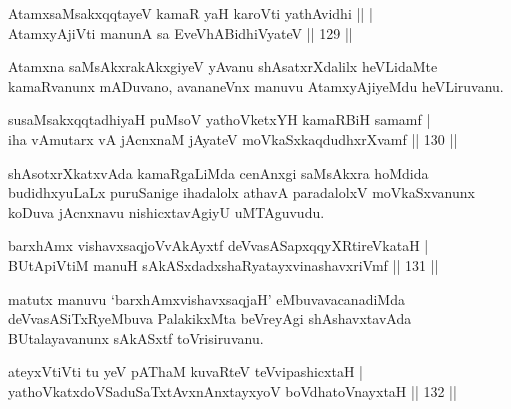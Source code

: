 \begin{shl}
AtamxsaMsakxqqtayeV kamaR yaH karoVti yathAvidhi \hfill || |\\
AtamxyAjiVti manunA sa EveVhABidhiVyateV \hfill || 129 ||
\end{shl}

\begin{artha}
Atamxna saMsAkxrakAkxgiyeV yAvanu shAsatxrXdalilx heVLidaMte kamaRvanunx mADuvano, avananeVnx manuvu AtamxyAjiyeMdu heVLiruvanu.
\end{artha}


\begin{shl}
susaMsakxqqtadhiyaH puMsoV yathoVketxYH kamaRBiH samamf |\\
iha vA\s mutarx vA jAcnxnaM jAyateV moVkaSxkaqdudhxrXvamf \hfill || 130 ||
\end{shl}

\begin{artha}
shAsotxrXkatxvAda kamaRgaLiMda cenAnxgi saMsAkxra hoMdida budidhxyuLaLx puruSanige ihadalolx athavA paradalolxV moVkaSxvanunx koDuva jAcnxnavu nishicxtavAgiyU uMTAguvudu.
\end{artha}

\begin{shl}
\footnotemark{}barxhAmx vishavxsaqjoVvAkAyxtf \footnotemark{}deVvasASapxqqyXRtireVkataH |\\
\footnotemark{}BUtApiVtiM manuH sAkASxdadxshaRyatayxvinashavxriVmf \hfill || 131 ||
\end{shl}
\begin{artha}
matutx manuvu `barxhAmxvishavxsaqjaH' eMbuvavacanadiMda deVvasASiTxRyeMbuva PalakikxMta beVreyAgi shAshavxtavAda BUtalayavanunx sAkASxtf toVrisiruvanu.
\end{artha}

\begin{shl}
ateyxVtiVti tu yeV pAThaM kuvaRteV teV\s vipashicxtaH |\\
yathoVkatxdoVSaduSaTxtAvxnAnxtayxyoV boVdhatoV\s nayxtaH \hfill || 132 ||
\end{shl}

